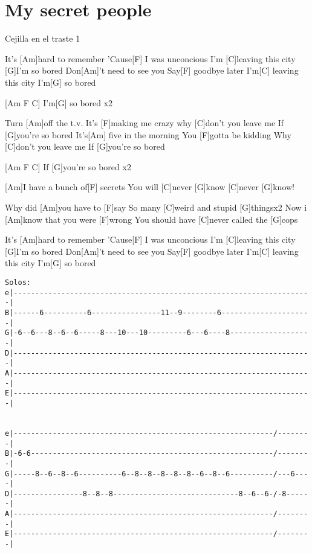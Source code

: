 \section{My secret people}
\begin{guitar}
\begin{multicols}{2}
Cejilla en el traste 1


It's [Am]hard to remember
'Cause[F] I was unconcious
I'm [C]leaving this city
[G]I'm so bored
Don[Am]'t need to see you
Say[F] goodbye later
I'm[C] leaving this city
I'm[G] so bored


[Am F C] I'm[G] so bored \hspace{2cm}x2


Turn [Am]off the t.v.
It's [F]making me crazy
why [C]don't you leave me
If [G]you're so bored
It's[Am] five in the morning
You [F]gotta be kidding
Why [C]don't you leave me
If [G]you're so bored


[Am F C] If [G]you're so bored \hspace{2cm}x2


[Am]I have a bunch of[F] secrets
You will [C]never [G]know
[C]never [G]know!


Why did [Am]you have to [F]say
So many [C]weird and stupid [G]things\hspace{2cm}x2
Now i [Am]know that you were [F]wrong
You should have [C]never called the [G]cops


It's [Am]hard to remember
'Cause[F] I was unconcious
I'm [C]leaving this city
[G]I'm so bored
Don[Am]'t need to see you
Say[F] goodbye later
I'm[C] leaving this city
I'm[G] so bored
\end{multicols}
\begin{texttt}
\begin{verbatim}
Solos:
e|---------------------------------------------------------------------|
B|------6----------6----------------11--9--------6---------------------|
G|-6--6---8--6--6-----8---10---10---------6---6----8-------------------|
D|---------------------------------------------------------------------|
A|---------------------------------------------------------------------|
E|---------------------------------------------------------------------|


e|------------------------------------------------------------/--------|
B|-6-6--------------------------------------------------------/--------|
G|-----8--6--8--6----------6--8--8--8--8--8--6--8--6----------/---6----|
D|----------------8--8--8-----------------------------8--6--6-/-8------|
A|------------------------------------------------------------/--------|
E|------------------------------------------------------------/--------|
\end{verbatim}
\end{texttt}
\end{guitar}
